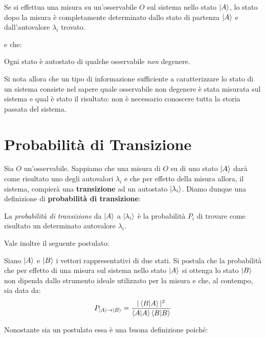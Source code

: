 \begin{mypost}
	Se si effettua una misura su un'osservabile $O$ sul sistema nello stato $\ket{A}$, lo stato dopo la misura è completamente determinato dallo stato di partenza $\ket{A}$ e dall'autovalore $\lambda_i$ trovato.
\end{mypost}

	e che:

\begin{mypost}
	Ogni stato è autostato di qualche osservabile \textit{non} degenere.
\end{mypost}
	
	Si nota allora che un tipo di informazione sufficiente a caratterizzare lo stato di un sistema consiste nel sapere quale osservabile non degenere è stata misurata sul sistema e qual è stato il risultato: non è necessario conoscere tutta la storia passata del sistema. 
	
\section{Probabilità di Transizione}
	
	Sia $O$ un'osservabile. Sappiamo che una misura di $O$ su di uno stato $\ket{A}$ darà come risultato uno degli autovalori $\lambda_i$ e che per effetto della misura allora, il sistema, compierà una \textbf{transizione} ad un autostato $\ket{\lambda_i}$. Diamo dunque una definizione di \textbf{probabilità di transizione}:

\begin{mydef}
	La \textit{probabilità di transizione} da $\ket{A}$ a $\ket{\lambda_i}$ è la probabilità $P_i$ di trovare come risultato un determinato autovalore $\lambda_i$.
\end{mydef}

	Vale inoltre il seguente postulato:

\begin{mypost}
	Siano $\ket{A}$ e $\ket{B}$ i vettori rappresentativi di due stati. Si postula che la probabilità che per effetto di una misura sul sistema nello stato $\ket{A}$ si ottenga lo stato $\ket{B}$ non dipenda dallo strumento ideale utilizzato per la misura e che, al contempo, sia data da:
\begin{align*}
	P_{\ket{A} \to \ket{B}} = \frac{|\braket{B}{A}|^2}{\braket{A}  \braket{B}}
\end{align*}
\end{mypost}

	Nonostante sia un postulato essa è una buona definizione poiché:
	
